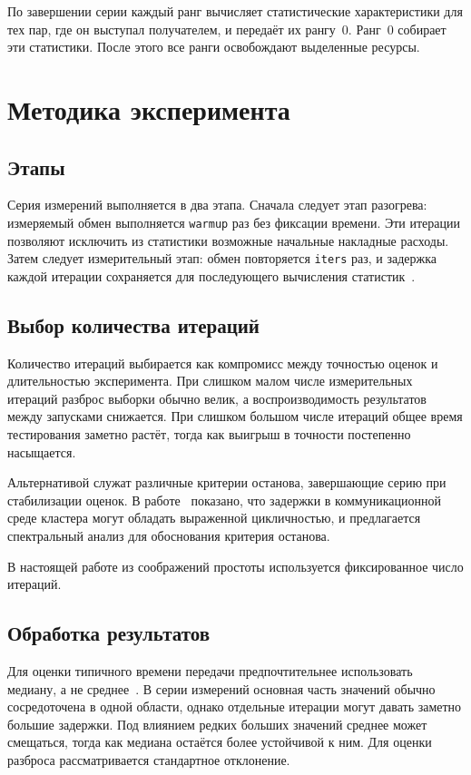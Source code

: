 \documentclass[a4paper,14pt]{extarticle}
\begin{document}
По завершении серии каждый ранг вычисляет статистические характеристики для тех пар, где он выступал получателем, и передаёт их рангу~0. Ранг~0 собирает эти статистики. После этого все ранги освобождают выделенные ресурсы.

\newpage

\section{Методика эксперимента}

\subsection{Этапы}

Серия измерений выполняется в два этапа. Сначала следует этап разогрева: измеряемый обмен выполняется \texttt{warmup} раз без фиксации времени. Эти итерации позволяют исключить из статистики возможные начальные накладные расходы. Затем следует измерительный этап: обмен повторяется \texttt{iters} раз, и задержка каждой итерации сохраняется для последующего вычисления статистик~\cite{hoefler2015}.

\subsection{Выбор количества итераций}

Количество итераций выбирается как компромисс между точностью оценок и длительностью эксперимента. При слишком малом числе измерительных итераций разброс выборки обычно велик, а воспроизводимость результатов между запусками снижается. При слишком большом числе итераций общее время тестирования заметно растёт, тогда как выигрыш в точности постепенно насыщается.

Альтернативой служат различные критерии останова, завершающие серию при стабилизации оценок. В работе~\cite{ruscdays23} показано, что задержки в коммуникационной среде кластера могут обладать выраженной цикличностью, и предлагается спектральный анализ для обоснования критерия останова.

В настоящей работе из соображений простоты используется фиксированное число итераций.

\subsection{Обработка результатов}
\label{sec:results-processing}
Для оценки типичного времени передачи предпочтительнее использовать медиану, а не среднее~\cite{hoefler2015}. В серии измерений основная часть значений обычно сосредоточена в одной области, однако отдельные итерации могут давать заметно большие задержки. Под влиянием редких больших значений среднее может смещаться, тогда как медиана остаётся более устойчивой к ним. Для оценки разброса рассматривается стандартное отклонение.
\end{document}
